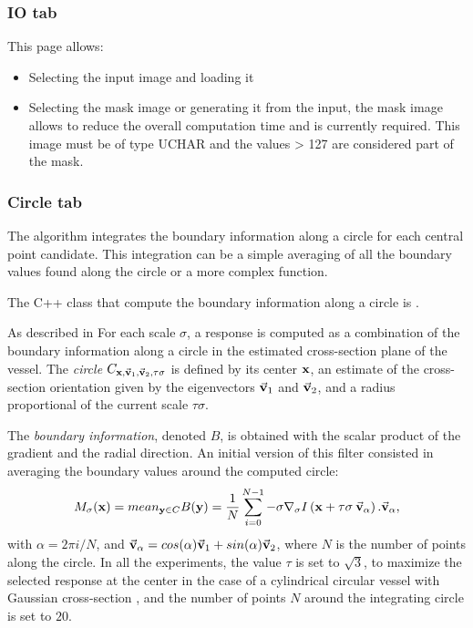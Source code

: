 \documentclass{article}
\newcommand{\vep}[1]  {  \vec{ \bf v}_{#1} }
\newcommand{\Vect}[1] {  \vec{\bf #1 } } %
\begin{document}
\subsubsection{IO tab}
This page allows:
\begin{itemize}
 \item Selecting the input image and loading it
 \item Selecting the mask image or generating it from the input, the mask image allows to reduce the overall computation time and is currently required. This image must be of type UCHAR and the values > 127 are considered part of the mask.
\end{itemize}

\subsubsection{Circle tab}
The algorithm integrates the boundary information along a circle for each central point candidate. This integration can be a simple averaging of all the boundary values found along the circle or a more complex function.

The C++ class that compute the boundary information along a circle is
.

As described in \cite{Krissian2000b,Krissian_al_2003,KA09}
For each scale $\sigma$, a response is computed as a combination of the boundary information
along a circle in the estimated cross-section plane of the vessel.
The {\em circle} $C_{{\bf x},\vep{1},\vep{2},\tau \sigma}$ is defined by its center ${\bf x}$,
an estimate of the cross-section orientation given
by the eigenvectors $\vep{1}$ and $\vep{2}$,
and a radius proportional of the current scale $\tau \sigma$.

The {\em boundary information}, denoted $B$, is obtained with the scalar product of the gradient and the radial direction.
An initial version of this filter consisted in averaging the boundary values around the computed circle:
\begin{equation}\label{eq:RepInt2}
    M_\sigma({\bf x}) = mean_{{\bf y} \in C}  B({\bf y})
    = \frac{1}{N}
    \sum_{i=0}^{N-1} - \sigma \nabla_{\sigma} I \left( {\bf x}+ \tau \sigma\:
    \Vect{v}_\alpha \right) . \Vect{v}_\alpha,
\end{equation}
with $\alpha = 2\pi i/N$,
and $\Vect{v}_\alpha = cos(\alpha) \vep{1} + sin(\alpha) \vep{2}$, where $N$ is the number
of points along the circle.
%
In all the experiments, the value  $\tau$ is set to $\sqrt{3}$, to maximize the selected response at the center in the case of a cylindrical circular vessel with Gaussian cross-section \cite{Krissian2000b},
and the number of points $N$ around the integrating circle is set to $20$.
\end{document}

